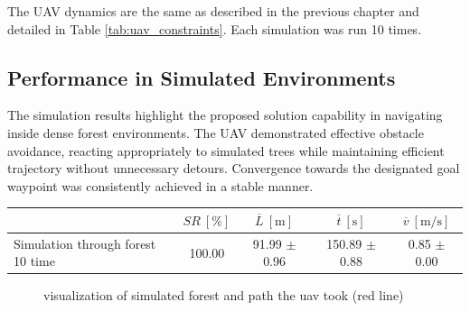             The UAV dynamics are the same as described in the previous chapter and detailed in Table \ref{tab:uav_constraints}. 
            Each simulation was run 10 times.            

        \subsection{Performance in Simulated Environments}
            The simulation results highlight the proposed solution capability in navigating inside dense forest environments. 
            The UAV demonstrated effective obstacle avoidance, reacting appropriately to simulated trees while maintaining efficient trajectory without unnecessary detours.
            Convergence towards the designated goal waypoint was consistently achieved in a stable manner.

            \begin{table}[H]
                \centering
                \renewcommand{\arraystretch}{1.2}
                \begin{tabular}{|l|c|c|c|c|}
                \hline
                                                  & \( SR \ [\%] \) & \( \overline{L} \ [\mathrm{m}] \) & \( \overline{t} \ [\mathrm{s}] \) &  \( \overline{v} \ [\mathrm{m/s}] \)     \\ \hline
                Simulation through forest 10 time & 100.00          & 91.99 $\pm$ 0.96                  & 150.89 $\pm$ 0.88                  &  0.85 $\pm$ 0.00                         \\ \hline
                \end{tabular}
            \end{table}

            \begin{figure}[H]
                \centering
                \caption{
                    visualization of simulated forest and path the uav took (red line)
                }
                \label{fig:simulated_forest_path}
            \end{figure}

